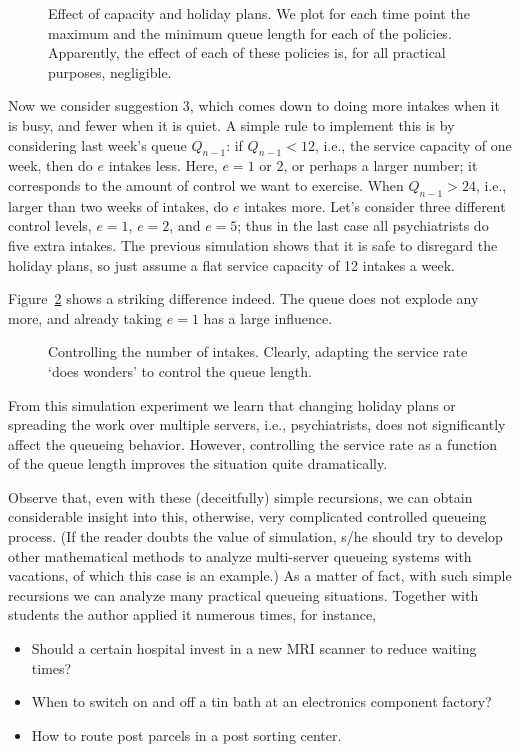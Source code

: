\begin{figure}[ht]
  \centering
 
\caption{Effect of capacity and holiday plans. We plot for each time point
  the maximum and the minimum queue length for each of the
  policies. Apparently, the effect of each of these policies is, for
  all practical purposes, negligible.  }
\label{fig:balanced}
\end{figure}


Now we consider suggestion 3, which comes down to doing more intakes
when it is busy, and fewer when it is quiet. A simple rule to
implement this is by considering last week's queue $Q_{n-1}$: if
$Q_{n-1}<12$, i.e., the service capacity of one week, then do $e$
intakes less. Here, $e=1$ or $2$, or perhaps a larger number; it
corresponds to the amount of control we want to exercise. When
$Q_{n-1}>24$, i.e., larger than two weeks of intakes, do $e$ intakes
more. Let's consider three different control levels, $e=1$, $e=2$, and
$e=5$; thus in the last case all psychiatrists do five extra intakes.
The previous simulation shows that it is safe to disregard the holiday
plans, so just assume a flat service capacity of 12 intakes a week.

Figure~\ref{fig:intakes} shows a striking difference indeed. The queue
does not explode any more, and already taking $e=1$ has a large
influence. 

\begin{figure}[ht]
  \centering
  
\caption{Controlling the number of intakes. Clearly, adapting the
  service rate `does wonders' to control the queue length.}
\label{fig:intakes}
\end{figure}

From this simulation experiment we learn that changing holiday plans or
spreading the work over multiple servers, i.e., psychiatrists, does
not significantly affect the queueing behavior.  However, controlling
the service rate as a function of the queue length improves the
situation quite dramatically. 


Observe that, even with these (deceitfully) simple recursions, we can obtain
considerable insight into this, otherwise, very complicated controlled
queueing process. (If the reader doubts the value of simulation, s/he
should try to develop other mathematical methods to analyze
multi-server queueing systems with vacations, of which this case is an
example.) As a matter of fact, with such simple recursions we can analyze many practical queueing
situations. Together with students the author applied it numerous
times, for instance,
\begin{itemize}
\item Should a certain hospital invest in a new MRI scanner to reduce
  waiting times?
\item When to switch on and off a tin bath at an electronics component factory?
\item How to route post parcels in a post sorting center.
\end{itemize}

